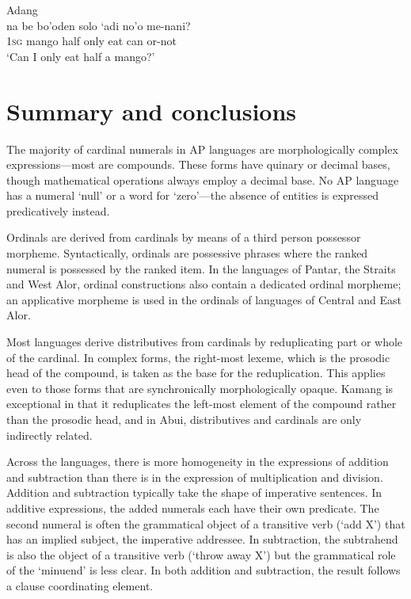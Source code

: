 \ea
Adang\\
\gll na  be  bo'oden  solo  `adi  no'o  me-nani? \\
  1\textsc{sg } mango  half  only  eat  can  or-not\\
\glt `Can I only eat half a mango?'
\z





\section{Summary and conclusions}
The majority of cardinal numerals in AP languages are morphologically complex expressions---most are compounds. These forms have quinary or decimal bases, though mathematical operations always employ a decimal base. No AP language has a numeral `null' or a word for `zero'---the absence of entities is expressed predicatively instead.

Ordinals are derived from cardinals by means of a third person possessor morpheme. Syntactically, ordinals are possessive phrases where the ranked numeral is possessed by the ranked item. In the languages of Pantar, the Straits and West Alor, ordinal constructions also contain a dedicated ordinal morpheme; an applicative morpheme is used in the ordinals of languages of Central and East Alor.

Most languages derive distributives from cardinals by reduplicating part or whole of the cardinal. In complex forms, the right-most lexeme, which is the prosodic head of the compound, is taken as the base for the reduplication. This applies even to those forms that are synchronically morphologically opaque. Kamang is exceptional in that it reduplicates the left-most element of the compound rather than the prosodic head, and in Abui, distributives and cardinals are only indirectly related.

Across the languages, there is more homogeneity in the expressions of addition and subtraction than there is in the expression of multiplication and division. Addition and subtraction typically take the shape of imperative sentences. In additive expressions, the added numerals each have their own predicate. The second numeral is often the grammatical object of a transitive verb (`add X') that has an implied subject, the imperative addressee. In subtraction, the subtrahend is also the object of a transitive verb (`throw away X') but the grammatical role of the `minuend' is less clear. In both addition and subtraction, the result follows a clause coordinating element.

